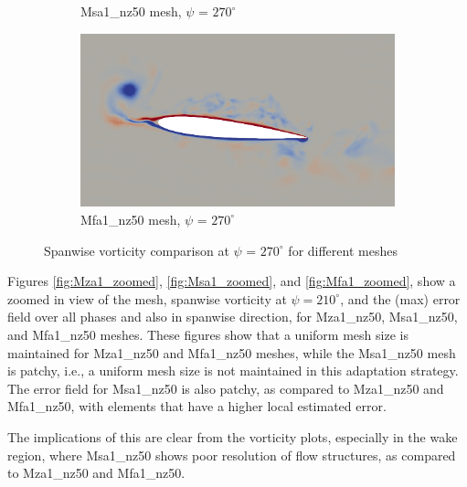 \begin{figure}[H]
\begin{subfigure}[b]{0.475\textwidth}
\caption{Msa1\_nz50 mesh, $\psi$ = $270^\circ$}
\label{fig:hadapt_psi270}
\end{subfigure}
\begin{subfigure}[b]{0.475\textwidth}
\centering
\includegraphics[width=1\textwidth]{figures/adapt_strat/vorticity_plots/Mfa1_50/phase_270.png}
\caption{Mfa1\_nz50 mesh, $\psi$ = $270^\circ$}
\label{fig:FB_psi270}
\end{subfigure}
\caption{Spanwise vorticity comparison at $\psi$ = $270^\circ$ for different meshes}
\label{fig:vorticity_270}
\end{figure}

Figures \ref{fig:Mza1_zoomed}, \ref{fig:Msa1_zoomed}, and \ref{fig:Mfa1_zoomed}, show a zoomed in view of the mesh, spanwise vorticity at $\psi=210^\circ$, and the (max) error field over all phases and also in spanwise direction, for Mza1\_nz50, Msa1\_nz50, and Mfa1\_nz50 meshes.
These figures show that a uniform mesh size is maintained for Mza1\_nz50 and Mfa1\_nz50 meshes, while the Msa1\_nz50 mesh is patchy, i.e., a uniform mesh size is not maintained in this adaptation strategy.
The error field for Msa1\_nz50 is also patchy, as compared to Mza1\_nz50 and Mfa1\_nz50, with elements that have a higher local estimated error.

The implications of this are clear from the vorticity plots, especially in the wake region, where Msa1\_nz50 shows poor resolution of flow structures, as compared to Mza1\_nz50 and Mfa1\_nz50.

